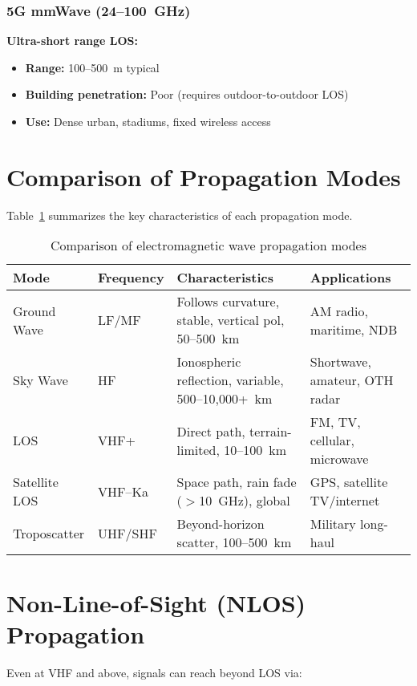 \subsubsection{5G mmWave (24--100~GHz)}

\textbf{Ultra-short range LOS:}
\begin{itemize}
\item \textbf{Range:} 100--500~m typical
\item \textbf{Building penetration:} Poor (requires outdoor-to-outdoor LOS)
\item \textbf{Use:} Dense urban, stadiums, fixed wireless access
\end{itemize}

\section{Comparison of Propagation Modes}

Table~\ref{tab:propagation-comparison} summarizes the key characteristics of each propagation mode.

\begin{table}[htbp]
\centering
\caption{Comparison of electromagnetic wave propagation modes}
\label{tab:propagation-comparison}
\small
\begin{tabular}{@{}llp{3.2cm}p{3.2cm}@{}}
\toprule
\textbf{Mode} & \textbf{Frequency} & \textbf{Characteristics} & \textbf{Applications} \\
\midrule
Ground Wave & LF/MF & Follows curvature, stable, vertical pol, 50--500~km & AM radio, maritime, NDB \\
Sky Wave & HF & Ionospheric reflection, variable, 500--10,000+~km & Shortwave, amateur, OTH radar \\
LOS & VHF+ & Direct path, terrain-limited, 10--100~km & FM, TV, cellular, microwave \\
Satellite LOS & VHF--Ka & Space path, rain fade ($>$10~GHz), global & GPS, satellite TV/internet \\
Troposcatter & UHF/SHF & Beyond-horizon scatter, 100--500~km & Military long-haul \\
\bottomrule
\end{tabular}
\end{table}

\section{Non-Line-of-Sight (NLOS) Propagation}

Even at VHF and above, signals can reach beyond LOS via:

